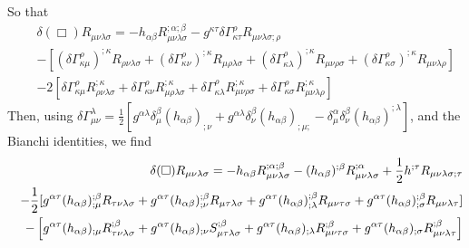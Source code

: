 So that
\begin{eqnarray}
&&\delta(\Box)R_{\mu\nu\lambda\sigma}=-h_{\alpha\beta}R_{\mu\nu\lambda\sigma}^{
;\alpha;\beta}-g^{\kappa\tau}\delta\Gamma_{\kappa\tau}^{\rho}R_{
\mu\nu\lambda\sigma;\rho}
\nonumber\\&&
-\left[(\delta\Gamma_{\kappa\mu}^{\rho})^{;\kappa}R_{\rho\nu\lambda\sigma}
+(\delta\Gamma_{\kappa\nu}^{\rho})^{;\kappa}R_{\mu\rho\lambda\sigma}
+(\delta\Gamma_{\kappa\lambda}^{\rho})^{;\kappa}R_{\mu\nu\rho\sigma}
+(\delta\Gamma_{\kappa\sigma}^{\rho})^{;\kappa}R_{\mu\nu\lambda\rho}\right]
\nonumber\\&&
-2\left[\delta\Gamma_{\kappa\mu}^{\rho}R_{\rho\nu\lambda\sigma}^{;\kappa}
+\delta\Gamma_{\kappa\nu}^{\rho}R_{\mu\rho\lambda\sigma}^{;\kappa}+\delta\Gamma_
{\kappa\lambda}^{\rho}R_{\mu\nu\rho\sigma}^{;\kappa}+\delta\Gamma_{\kappa\sigma}
^{\rho}R_{\mu\nu\lambda\rho}^{;\kappa}\right]
\end{eqnarray}
Then, using
$\delta\Gamma_{\mu\nu}^{\lambda}=\frac{1}{2}[g^{\alpha\lambda}\delta_{\mu}^{
\beta}(h_{\alpha\beta})_{;\nu}+g^{\alpha\lambda}\delta_{\nu}^{\beta}(h_{
\alpha\beta})_{;\mu;}-\delta_{\mu}^{\alpha}\delta_{\nu}^{\beta}(h_{\alpha\beta}
)^{;\lambda}]$, and the Bianchi identities, we find
\begin{eqnarray}
&&\delta(\Box)R_{\mu\nu\lambda\sigma}=-h_{\alpha\beta}R_{\mu\nu\lambda\sigma}^{
;\alpha;\beta}-(h_{\alpha\beta})^{;\beta}R_{\mu\nu\lambda\sigma}^{;\alpha}+\frac
{1}{2}h{}^{;\tau}R_{\mu\nu\lambda\sigma;\tau}
\\&&
-\frac{1}{2}[g^{\alpha\tau}(h_{\alpha\beta})_{;\mu}^{;\beta}R_{
\tau\nu\lambda\sigma}+g^{\alpha\tau}(h_{\alpha\beta})_{;\nu}^{;\beta}R_{
\mu\tau\lambda\sigma}+g^{\alpha\tau}(h_{\alpha\beta})_{;\lambda}^{;\beta}R_{
\mu\nu\tau\sigma}+g^{\alpha\tau}(h_{\alpha\beta})_{;\sigma}^{;\beta}R_{
\mu\nu\lambda\tau}]
\nonumber\\&&
-\left[g^{\alpha\tau}(h_{\alpha\beta})_{;\mu}R_{\tau\nu\lambda\sigma}^{;\beta}
+g^{\alpha\tau}(h_{\alpha\beta})_{;\nu}S_{\mu\tau\lambda\sigma}^{;\beta}+g^{
\alpha\tau}(h_{\alpha\beta})_{;\lambda}R_{\mu\nu\tau\sigma}^{;\beta}+g^{
\alpha\tau}(h_{\alpha\beta})_{;\sigma}R_{\mu\nu\lambda\tau}^{;\beta}\right]\nonumber
\end{eqnarray}
